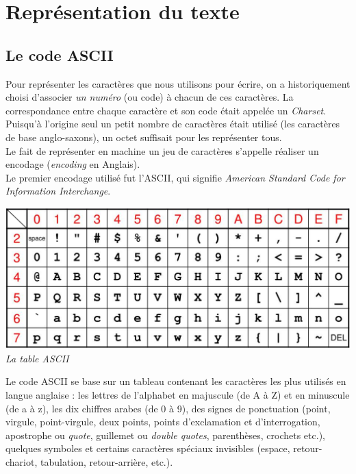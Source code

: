 \chapter{Représentation du texte}

\section{Le code ASCII}


Pour représenter les caractères que nous utilisons pour écrire, on a historiquement choisi d'associer \textit{un numéro} (ou code) à chacun de
ces caractères. La correspondance entre chaque caractère et son code était appelée un \textit{Charset}.\\
Puisqu'à l'origine seul un petit nombre de caractères était utilisé (les caractères de base anglo-saxons), un octet suffisait pour les
représenter tous.\\
Le fait de représenter en machine un jeu de caractères s'appelle réaliser un encodage (\textit{encoding} en Anglais).\\

Le premier encodage utilisé fut l'\textsc{ASCII}, qui signifie  \textit{American Standard Code for Information Interchange}.\\

\begin{center}
    \includegraphics[width=\columnwidth]{img/ASCII.png}\\
    \textit{La table ASCII}
\end{center}
Le code ASCII se base sur un tableau contenant les caractères les plus utilisés en langue anglaise : les lettres de l'alphabet en majuscule (de A
à Z) et en minuscule (de a à z),
les dix chiffres arabes (de 0 à 9), des signes de ponctuation (point, virgule, point-virgule, deux points, points d'exclamation et
d'interrogation, apostrophe ou \textit{quote}, guillemet
ou \textit{double quotes}, parenthèses, crochets etc.), quelques symboles et certains caractères spéciaux invisibles (espace, retour-chariot,
tabulation, retour-arrière, etc.).\\

